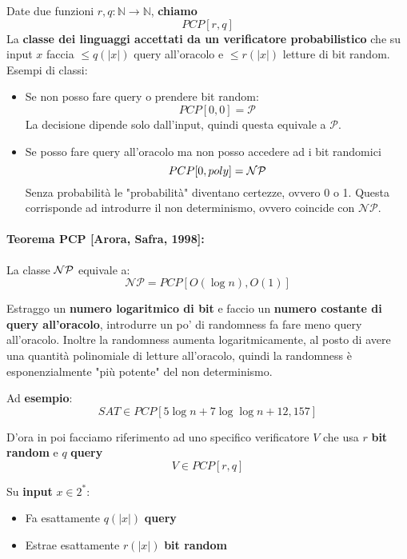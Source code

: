Date due funzioni $r,q : \mathbb{N} \rightarrow \mathbb{N}$, \textbf{chiamo} 
$$ PCP [r,q] $$
La \textbf{classe dei linguaggi accettati da un verificatore probabilistico} che su input $x$ faccia $\leq q(|x|)$ query all'oracolo e $\leq r(|x|)$ letture di bit random.\\

Esempi di classi: 
\begin{itemize}
	\item Se non posso fare query o prendere bit random:
	$$ PCP [0,0] = \mathcal{P} $$
	La decisione dipende solo dall'input, quindi questa equivale a $\mathcal{P}$.\\
	
	\item Se posso fare query all'oracolo ma non posso accedere ad i bit randomici
	$$ PCP [0, poly] = \mathcal{NP} $$
	Senza probabilità le "probabilità" diventano certezze, ovvero 0 o 1. Questa corrisponde ad introdurre il non determinismo, ovvero coincide con $\mathcal{NP}$.\\
\end{itemize}

\paragraph{Teorema PCP [Arora, Safra, 1998]: } La classe $\mathcal{NP}$ equivale a:
$$\mathcal{NP} = PCP [O (\log n), O(1)] $$

Estraggo un \textbf{numero logaritmico di bit} e faccio un \textbf{numero costante di query all'oracolo}, introdurre un po' di randomness fa fare meno query all'oracolo. Inoltre la randomness aumenta logaritmicamente, al posto di avere una quantità polinomiale di letture all'oracolo, quindi la randomness è esponenzialmente "più potente" del non determinismo.\\

\newpage

Ad \textbf{esempio}: 
$$ SAT \in PCP [ 5 \log n + 7 \log \log n + 12, 157] $$

D'ora in poi facciamo riferimento ad uno specifico verificatore $V$ che usa $r$ \textbf{bit random} e $q$ \textbf{query}
$$ V \in PCP [r,q] $$

Su \textbf{input} $x \in 2^\ast$:
\begin{itemize}
	\item Fa esattamente $q(|x|)$ \textbf{query}
	\item Estrae esattamente $r(|x|)$ \textbf{bit random}
\end{itemize}

